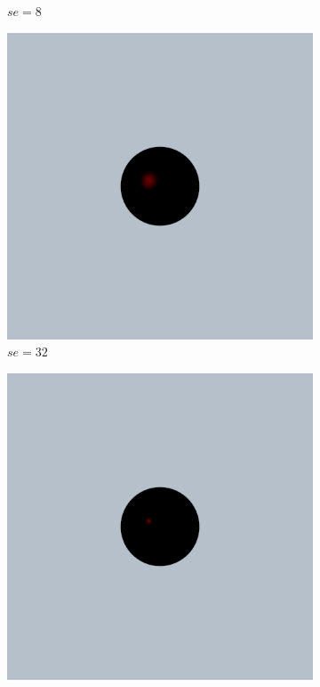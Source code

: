 \documentclass{article}
\begin{document}
\begin{figure}[h!]
\begin{subfigure}{0.2\textwidth}
		\caption{$se = 8$}
		\label{fig:specular_0_1_8}
	\end{subfigure}%
	\hfill
	\begin{subfigure}{0.2\textwidth}
		\includegraphics[width=\textwidth]{specular_sc_0_1_se_32}
		\caption{$se = 32$}
		\label{fig:specular_0_1_32}
	\end{subfigure}%
	\hfill
	\begin{subfigure}{0.2\textwidth}
		\includegraphics[width=\textwidth]{specular_sc_0_1_se_256}

\end{subfigure}
\end{figure}
\end{document}
